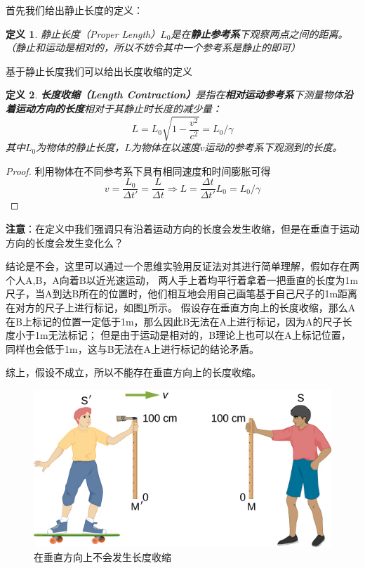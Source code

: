 \documentclass[12pt, a4paper, oneside]{ctexart}
\newtheorem{definition}{定义}[section]
\numberwithin{equation}{section}  %
\begin{document}
首先我们给出静止长度的定义：
\begin{definition}
    静止长度（Proper Length）$L_0$是在\textbf{静止参考系}下观察两点之间的距离。（静止和运动是相对的，所以不妨令其中一个参考系是静止的即可）
\end{definition}
基于静止长度我们可以给出长度收缩的定义
\begin{definition}
    \textbf{长度收缩（Length Contraction）}是指在\textbf{相对运动参考系}下测量物体\textbf{沿着运动方向的长度}相对于其静止时长度的减少量：
    \begin{equation}
        L = L_0\sqrt{1-\frac{v^2}{c^2}} = L_0/\gamma
    \end{equation}
    其中$L_0$为物体的静止长度，$L$为物体在以速度$v$运动的参考系下观测到的长度。
\end{definition}
\begin{proof}
    利用物体在不同参考系下具有相同速度和时间膨胀可得
    \begin{equation}
        v = \frac{L_0}{\Delta t'} = \frac{L}{\Delta t}\Rightarrow L = \frac{\Delta t}{\Delta t'}L_0 = L_0/\gamma
    \end{equation}
\end{proof}

\textbf{注意}：在定义中我们强调只有沿着运动方向的长度会发生收缩，但是在垂直于运动方向的长度会发生变化么？

结论是不会，这里可以通过一个思维实验用反证法对其进行简单理解，假如存在两个人A,B，A向着B以近光速运动，
两人手上着均平行着拿着一把垂直的长度为1m尺子，当A到达B所在的位置时，他们相互地会用自己画笔基于自己尺子的1m距离在对方的尺子上进行标记，如图\ref{fig-length-contraction}所示。
假设存在垂直方向上的长度收缩，那么A在B上标记的位置一定低于1m，那么因此B无法在A上进行标记，因为A的尺子长度小于1m无法标记；
但是由于运动是相对的，B理论上也可以在A上标记位置，同样也会低于1m，这与B无法在A上进行标记的结论矛盾。

综上，假设不成立，所以不能存在垂直方向上的长度收缩。

\begin{figure}[htbp]
    \centering
    \includegraphics[scale=1]{length_contraction.jpg}
    \caption{在垂直方向上不会发生长度收缩}
    \label{fig-length-contraction}
\end{figure}
\end{document}

